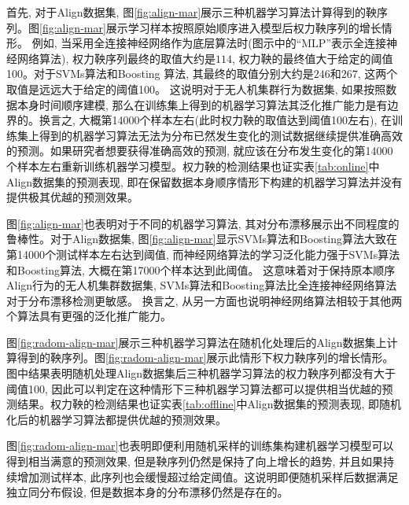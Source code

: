 首先, 对于Align数据集, 图\ref{fig:align-mar}展示三种机器学习算法计算得到的鞅序列。图\ref{fig:align-mar}展示学习样本按照原始顺序进入模型后权力鞅序列的增长情形。 例如, 当采用全连接神经网络作为底层算法时(图示中的“MLP”表示全连接神经网络算法), 权力鞅序列最终的取值大约是$114$, 权力鞅的最终值大于给定的阈值100。对于SVMs算法和Boosting 算法, 其最终的取值分别大约是$246$和$267$, 这两个取值是远远大于给定的阈值100。 这说明对于无人机集群行为数据集, 如果按照数据本身时间顺序建模, 那么在训练集上得到的机器学习算法其泛化推广能力是有边界的。换言之, 大概第14000个样本左右(此时权力鞅的取值达到阈值100左右), 在训练集上得到的机器学习算法无法为分布已然发生变化的测试数据继续提供准确高效的预测。如果研究者想要获得准确高效的预测, 就应该在分布发生变化的第14000个样本左右重新训练机器学习模型。权力鞅的检测结果也证实表\ref{tab:online}中Align数据集的预测表现, 即在保留数据本身顺序情形下构建的机器学习算法并没有提供极其优越的预测效果。

图\ref{fig:align-mar}也表明对于不同的机器学习算法, 其对分布漂移展示出不同程度的鲁棒性。对于Align数据集, 图\ref{fig:align-mar}显示SVMs算法和Boosting算法大致在第14000个测试样本左右达到阈值, 而神经网络算法的学习泛化能力强于SVMs算法和Boosting算法, 大概在第17000个样本达到此阈值。 这意味着对于保持原本顺序Align行为的无人机集群数据集, SVMs算法和Boosting算法比全连接神经网络算法对于分布漂移检测更敏感。 换言之, 从另一方面也说明神经网络算法相较于其他两个算法具有更强的泛化推广能力。

图\ref{fig:radom-align-mar}展示三种机器学习算法在随机化处理后的Align数据集上计算得到的鞅序列。图\ref{fig:radom-align-mar}展示此情形下权力鞅序列的增长情形。图中结果表明随机处理Align数据集后三种机器学习算法的权力鞅序列都没有大于阈值100, 因此可以判定在这种情形下三种机器学习算法都可以提供相当优越的预测结果。权力鞅的检测结果也证实表\ref{tab:offline}中Align数据集的预测表现, 即随机化后的机器学习算法都提供优越的预测效果。

图\ref{fig:radom-align-mar}也表明即便利用随机采样的训练集构建机器学习模型可以得到相当满意的预测效果, 但是鞅序列仍然是保持了向上增长的趋势, 并且如果持续增加测试样本, 此序列也会缓慢超过给定阈值。这说明即便随机采样后数据满足独立同分布假设, 但是数据本身的分布漂移仍然是存在的。

